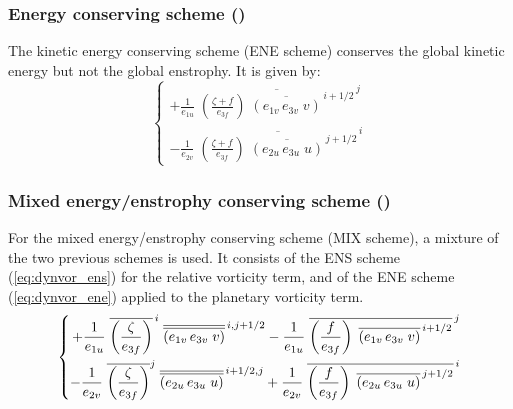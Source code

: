 \documentclass[../tex_main/NEMO_manual]{subfiles}
\begin{document}
\subsubsection{Energy conserving scheme (\protect{})}
\label{subsec:DYN_vor_ene}

The kinetic energy conserving scheme (ENE scheme) conserves the global kinetic energy but not the global enstrophy.
It is given by:
\begin{equation} \label{eq:dynvor_ene}
\left\{   \begin{aligned}
{+\frac{1}{e_{1u}}\; {\overline {\left( {\frac{\zeta +f}{e_{3f} }} \right)
                            \;  \overline {\left( {e_{1v}\,e_{3v}\;v} \right)} ^{\,i+1/2}} }^{\,j} }    \\
{- \frac{1}{e_{2v}}\; {\overline {\left( {\frac{\zeta +f}{e_{3f} }} \right)
                            \;  \overline {\left( {e_{2u}\,e_{3u}\;u} \right)} ^{\,j+1/2}} }^{\,i} }
\end{aligned}    \right.
\end{equation} 

\subsubsection{Mixed energy/enstrophy conserving scheme (\protect{}) }
\label{subsec:DYN_vor_mix}

For the mixed energy/enstrophy conserving scheme (MIX scheme), a mixture of the two previous schemes is used.
It consists of the ENS scheme (\autoref{eq:dynvor_ens}) for the relative vorticity term,
and of the ENE scheme (\autoref{eq:dynvor_ene}) applied to the planetary vorticity term.
\begin{equation} \label{eq:dynvor_mix}
\left\{ {     \begin{aligned}
 {+\frac{1}{e_{1u} }\; {\overline {\left( {\frac{\zeta }{e_{3f} }} \right)} }^{\,i} 
 \; {\overline{\overline {\left( {e_{1v}\,e_{3v}\;v} \right)}} }^{\,i,j+1/2} -\frac{1}{e_{1u} }
 \; {\overline {\left( {\frac{f}{e_{3f} }} \right) 
 \;\overline {\left( {e_{1v}\,e_{3v}\;v} \right)} ^{\,i+1/2}} }^{\,j} } \\
{-\frac{1}{e_{2v} }\; {\overline {\left( {\frac{\zeta }{e_{3f} }} \right)} }^j
 \; {\overline{\overline {\left( {e_{2u}\,e_{3u}\;u} \right)}} }^{\,i+1/2,j} +\frac{1}{e_{2v} }
 \; {\overline {\left( {\frac{f}{e_{3f} }} \right)
 \;\overline {\left( {e_{2u}\,e_{3u}\;u} \right)} ^{\,j+1/2}} }^{\,i} } \hfill
\end{aligned}     } \right.
\end{equation} 
\end{document}

